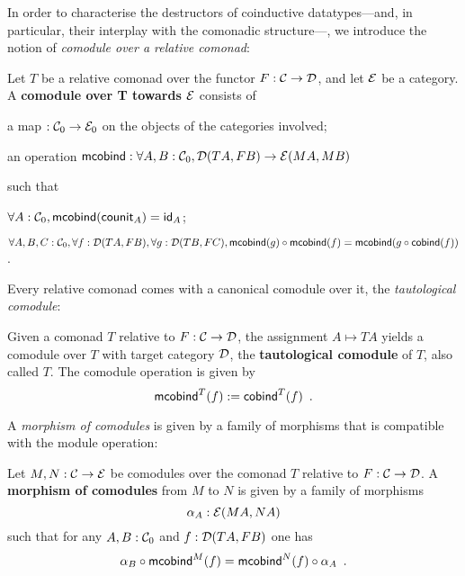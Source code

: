 \documentclass{amsart}
\newcommand{\fat}[1]{\textbf{#1}}
\begin{document}
In order to characterise the destructors of coinductive datatypes---and, in particular, their interplay with the comonadic structure---, 
we introduce the notion of \emph{comodule
over a relative comonad}:

\begin{definition}\label{def:comodule}
 Let $T$ be a relative comonad over the functor $F:\C\to\D$, and let $\E$ be a category.
 A \fat{comodule over T towards $\E$} consists of
   \begin{packitem}
   \item a map $:\C_0 \to \E_0$ on the objects of the categories involved;
   \item an operation $\mcobind: \forall A,B:\C_0, \D(TA,FB) \to \E(MA,MB)$
  \end{packitem}
  such that 
  \begin{packitem}
   \item $\forall A : \C_0, \mcobind(\counit_A) = \id_A$;
   \item $\forall A,B,C:\C_0, \forall f : \D(TA,FB),\forall g:\D(TB,FC), \\
        \comp{\mcobind(f)}{\mcobind(g)} = \mcobind(\comp{\cobind(f)}{g})$ .
  \end{packitem}

\end{definition}

Every relative comonad comes with a canonical comodule over it, the \emph{tautological comodule}:

\begin{definition}\label{def:tautological_comodule}
  Given a comonad $T$ relative to $F:\C\to\D$, the assignment $A \mapsto TA$ yields a comodule over $T$ 
  with target category $\D$, the \textbf{tautological comodule} of $T$, also called $T$.
  The comodule operation is given by
    \[  \mcobind^T(f) := \cobind^T(f) \enspace . \]
\end{definition}


A \emph{morphism of comodules} is given by a family of morphisms that is compatible with 
the module operation:

\begin{definition}\label{def:morphism_of_comodules}
 Let $M, N : \C \to \E$ be comodules over the comonad $T$ relative to  $F:\C \to \D$.
 A \fat{morphism of comodules} from $M$ to $N$ is given by a family of morphisms 
   \[ \alpha_A:\E(MA,NA) \]
 such that for any $A,B:\C_0$ and $f : \D(TA,FB)$ one has
 \[   \comp{\mcobind^M(f)}{\alpha_B} = \comp{\alpha_A}{\mcobind^N(f)} \enspace . \]
\end{definition}
\end{document}
